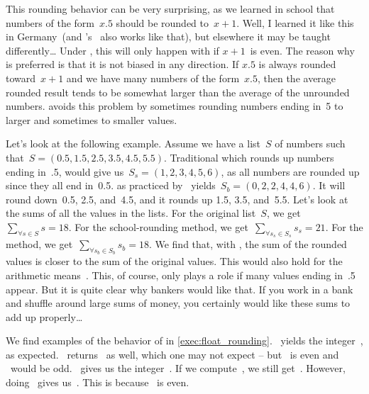 This rounding behavior can be very surprising, as we learned in school that numbers of the form~$x.5$ should be rounded to~$x+1$.
Well, I learned it like this in Germany~(and 's~ also works like that\cite{O2024JPSEJDKV2AS}), but elsewhere it may be taught differently{\dots}
Under , this will only happen with  if $x+1$~is even.
The reason why  is preferred is that it is not biased in any direction.
If $x.5$ is always rounded toward~$x+1$ and we have many numbers of the form~$x.5$, then the average rounded result tends to be somewhat larger than the average of the unrounded numbers.
 avoids this problem by sometimes rounding numbers ending in~5 to larger and sometimes to smaller values.%
%
\begin{sloppypar}%
Let's look at the following example.
Assume we have a list~$S$ of numbers such that~$S=(0.5, 1.5, 2.5, 3.5, 4.5, 5.5)$.
Traditional  which rounds up numbers ending in~.5, would give us~$S_s = (1, 2, 3, 4, 5, 6)$, as all numbers are rounded up since they all end in~0.5.
 as practiced by \python\ yields~$S_b=(0, 2, 2, 4, 4, 6)$.
It will round down~0.5, 2.5, and~4.5, and it rounds up 1.5, 3.5, and~5.5.
Let's look at the sums of all the values in the lists.
For the original list~$S$, we get~$\sum_{\forall s\in S} s=18$.
For the school-rounding method, we get~$\sum_{\forall s_s\in S_s} s_s=21$.
For the  method, we get~$\sum_{\forall s_b\in S_b} s_b=18$.
We find that, with , the sum of the rounded values is closer to the sum of the original values.
This would also hold for the arithmetic means~\arithMean.
This, of course, only plays a role if many values ending in~.5 appear.
But it is quite clear why bankers would like that.
If you work in a bank and shuffle around large sums of money, you certainly would like these sums to add up properly{\dots}%
\end{sloppypar}%
%
We find examples of the behavior of  in \cref{exec:float_rounding}.
~yields the integer~, as expected.
~returns~ as well, which one may not expect -- but ~is even and ~would be odd.
~gives us the integer~.
If we compute~, we still get~.
However, doing~ gives us~.
This is because ~is even.

